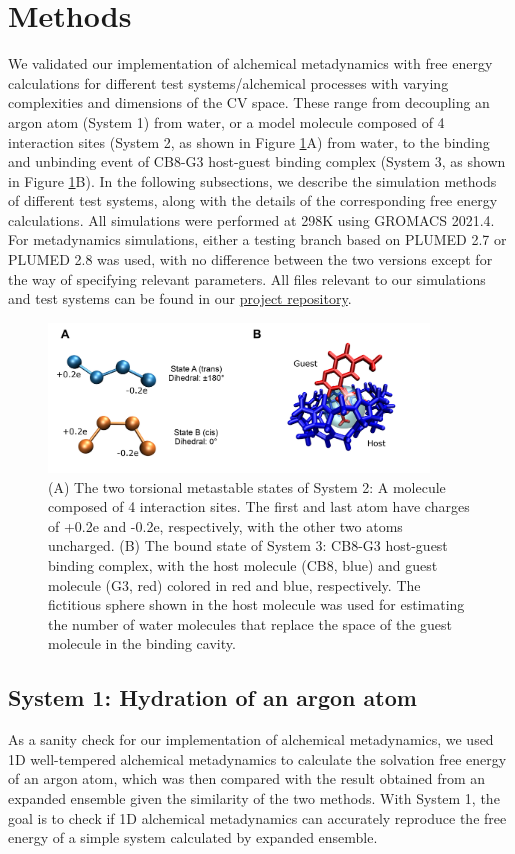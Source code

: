 \documentclass[journal=jacsat,manuscript=article]{achemso}
\begin{document}
\section{Methods}\label{methods}
We validated our implementation of alchemical metadynamics with free energy calculations for different test systems/alchemical processes with varying complexities and dimensions of the CV space. These range from decoupling an argon atom (System 1) from water, or a model molecule composed of 4 interaction sites (System 2, as shown in Figure \ref{test_sys}A) from water, to the binding and unbinding event of CB8-G3 host-guest binding complex (System 3, as shown in Figure \ref{test_sys}B). In the following subsections, we describe the simulation methods of different test systems, along with the details of the corresponding free energy calculations. All simulations were performed at 298K using GROMACS 2021.4. For metadynamics simulations, either a testing branch based on PLUMED 2.7 or PLUMED 2.8 was used, with no difference between the two versions except for the way of specifying relevant parameters. All files relevant to our simulations and test systems can be found in our \href{https://github.com/shirsgroup/alchemical_MetaD}{project repository}. 

\begin{figure}[ht]
    \centering
    \includegraphics[width=0.9\textwidth]{Figures/sys.png}   
    \caption{(A) The two torsional metastable states of System 2: A molecule composed of 4 interaction sites. The first and last atom have charges of +0.2e and -0.2e, respectively, with the other two atoms uncharged. (B) The bound state of System 3: CB8-G3 host-guest binding complex, with the host molecule (CB8, blue) and guest molecule (G3, red) colored in red and blue, respectively. The fictitious sphere shown in the host molecule was used for estimating the number of water molecules that replace the space of the guest molecule in the binding cavity.}
    \label{test_sys}
\end{figure}

\subsection{System 1: Hydration of an argon atom}
As a sanity check for our implementation of alchemical metadynamics, we used 1D well-tempered alchemical metadynamics to calculate the solvation free energy of an argon atom, which was then compared with the result obtained from an expanded ensemble given the similarity of the two methods. With System 1, the goal is to check if 1D alchemical metadynamics can accurately reproduce the free energy of a simple system calculated by expanded ensemble. 
\end{document}
